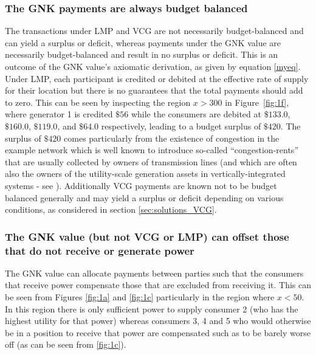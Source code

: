 \subsubsection*{The GNK payments are always budget balanced}
The transactions under LMP and VCG are not necessarily budget-balanced and can yield a surplus or deficit, whereas payments under the GNK value are necessarily budget-balanced and result in no surplus or deficit.
This is an outcome of the GNK value's axiomatic derivation, as given by equation \eqref{myeq}.
Under LMP, each participant is credited or debited at the effective rate of supply for their location but there is no guarantees that the total payments should add to zero.
This can be seen by inspecting the region $x>300$ in Figure~\ref{fig:1f}, where generator 1 is credited $\$56$ while the consumers are debited at $\$133.0$, $\$160.0$, $\$119.0$, and $\$64.0$ respectively, leading to a budget surplus of $\$420$.
The surplus of $\$420$ comes particularly from the existence of congestion in the example network which is well known to introduce so-called ``congestion-rents'' that are usually collected by owners of transmission lines (and which are often also the owners of the utility-scale generation assets in vertically-integrated systems - see \cite{lmp2}).
Additionally VCG payments are known not to be budget balanced generally and may yield a surplus or deficit depending on various conditions, as considered in section \ref{sec:solutions_VCG}.


\subsubsection*{The GNK value (but not VCG or LMP) can offset those that do not receive or generate power}
The GNK value can allocate payments between parties such that the consumers that receive power compensate those that are excluded from receiving it.
This can be seen from Figures \ref{fig:1a} and \ref{fig:1c} particularly in the region where $x<50$.
In this region there is only sufficient power to supply consumer 2 (who has the highest utility for that power) whereas consumers 3, 4 and 5 who would otherwise be in a position to receive that power are
compensated such as to be barely worse off (as can be seen from \ref{fig:1c}).


